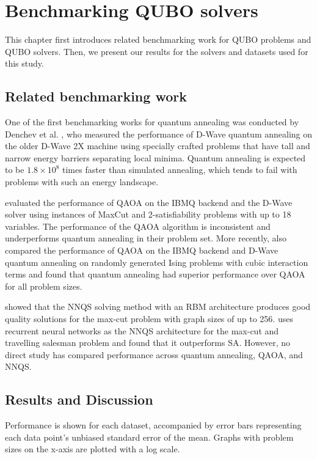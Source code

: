 \chapter{Benchmarking QUBO solvers}\label{benchmark}
This chapter first introduces related benchmarking work for QUBO problems and QUBO solvers. Then, we present our results for the solvers and datasets used for this study.

\section{Related benchmarking work}
One of the first benchmarking works for quantum annealing was conducted by Denchev et al. , who measured the performance of D-Wave quantum annealing on the older D-Wave 2X machine using specially crafted problems that have tall and narrow energy barriers separating local minima. Quantum annealing is expected to be $1.8 \times 10^8$ times faster than simulated annealing, which tends to fail with problems with such an energy landscape.


 evaluated the performance of QAOA on the IBMQ backend and the D-Wave solver using instances of MaxCut and 2-satisfiability problems with up to 18 variables. The performance of the QAOA algorithm is inconsistent and underperforms quantum annealing in their problem set. More recently,  also compared the performance of QAOA on the IBMQ backend and D-Wave quantum annealing on randomly generated Ising problems with cubic interaction terms and found that quantum annealing had superior performance over QAOA for all problem sizes.

 showed that the NNQS solving method with an RBM architecture produces good quality solutions for the max-cut problem with graph sizes of up to 256.  uses recurrent neural networks as the NNQS architecture for the max-cut and travelling salesman problem and found that it outperforms SA. However, no direct study has compared performance across quantum annealing, QAOA, and NNQS.

\section{Results and Discussion}
Performance is shown for each dataset, accompanied by error bars representing each data point's unbiased standard error of the mean. Graphs with problem sizes on the x-axis are plotted with a log scale.

